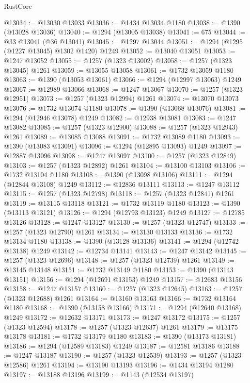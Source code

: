 \begin{lexlean}{RustCore}
\begin{coremodule}
@13034 := @13030 @13033
@13036 := @1434 @13034 @1180
@13038 := @1390 (@13028 @13036)
@13040 := @1294 (@13005 @13038)
@13041 := 675
@13044 := @33 @13041 (@36 @13041)
@13045 := @1297 @13044
@13051 := @1294 (@1295 (@1227 @13045) @1302 @1420) @1249
@13052 := @13040 @13051
@13053 := @1247 @13052
@13055 := @1257 (@1323 @13002)
@13058 := @1257 (@1323 @13045) @1261
@13059 := @13055 @13058
@13061 := @1732 @13059 @1180
@13063 := @1390 (@13053 @13061)
@13066 := @1294 (@12997 @13063) @1249
@13067 := @12989 @13066
@13068 := @1247 @13067
@13070 := @1257 (@1323 @12951)
@13073 := @1257 (@1323 @12994) @1261
@13074 := @13070 @13073
@13076 := @1732 @13074 @1180
@13078 := @1390 (@13068 @13076)
@13081 := @1294 (@12946 @13078) @1249
@13082 := @12938 @13081
@13083 := @1247 @13082
@13085 := @1257 (@1323 @12900)
@13088 := @1257 (@1323 @12943) @1261
@13089 := @13085 @13088
@13091 := @1732 @13089 @1180
@13093 := @1390 (@13083 @13091)
@13096 := @1294 (@12895 @13093) @1249
@13097 := @12887 @13096
@13098 := @1247 @13097
@13100 := @1257 (@1323 @12849)
@13103 := @1257 (@1323 @12892) @1261
@13104 := @13100 @13103
@13106 := @1732 @13104 @1180
@13108 := @1390 (@13098 @13106)
@13111 := @1294 (@12844 @13108) @1249
@13112 := @12836 @13111
@13113 := @1247 @13112
@13115 := @1257 (@1323 @12798)
@13118 := @1257 (@1323 @12841) @1261
@13119 := @13115 @13118
@13121 := @1732 @13119 @1180
@13123 := @1390 (@13113 @13121)
@13126 := @1294 (@12793 @13123) @1249
@13127 := @12785 @13126
@13128 := @1247 @13127
@13130 := @1257 (@1323 @12747)
@13133 := @1257 (@1323 @12790) @1261
@13134 := @13130 @13133
@13136 := @1732 @13134 @1180
@13138 := @1390 (@13128 @13136)
@13141 := @1294 (@12742 @13138) @1249
@13142 := @12734 @13141
@13143 := @1247 @13142
@13145 := @1257 (@1323 @12696)
@13148 := @1257 (@1323 @12739) @1261
@13149 := @13145 @13148
@13151 := @1732 @13149 @1180
@13153 := @1390 (@13143 @13151)
@13156 := @1294 (@12691 @13153) @1249
@13157 := @12683 @13156
@13158 := @1247 @13157
@13160 := @1257 (@1323 @12645)
@13163 := @1257 (@1323 @12688) @1261
@13164 := @13160 @13163
@13166 := @1732 @13164 @1180
@13168 := @1390 (@13158 @13166)
@13171 := @1294 (@12640 @13168) @1249
@13172 := @12632 @13171
@13173 := @1247 @13172
@13175 := @1257 (@1323 @12594)
@13178 := @1257 (@1323 @12637) @1261
@13179 := @13175 @13178
@13181 := @1732 @13179 @1180
@13183 := @1390 (@13173 @13181)
@13186 := @1294 (@12589 @13183) @1249
@13187 := @12581 @13186
@13188 := @1247 @13187
@13190 := @1257 (@1323 @12539)
@13193 := @1257 (@1323 @12586) @1261
@13194 := @13190 @13193
@13196 := @1434 @13194 @1280
@13197 := @13188 @13196
@13199 := @1143 (@12534 @13197)

\end{coremodule}
\end{lexlean}
